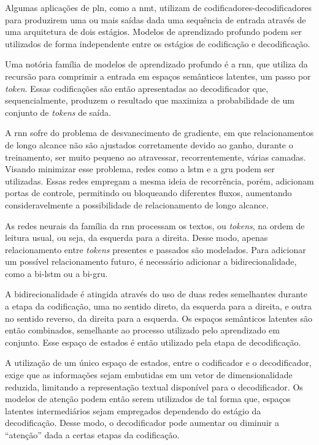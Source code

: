 Algumas aplicações de \gls{pln}, como a \gls{nmt}, utilizam de codificadores-decodificadores para produzirem uma ou mais saídas dada uma sequência de entrada através de uma arquitetura de dois estágios. Modelos de aprendizado profundo podem ser utilizados de forma independente entre os estágios de codificação e decodificação.

Uma notória família de modelos de aprendizado profundo é a \gls{rnn}, que utiliza da recursão para comprimir a entrada em espaços semânticos latentes, um passo por \textit{token}. Essas codificações são então apresentadas ao decodificador que, sequencialmente, produzem o resultado que maximiza a probabilidade de um conjunto de \textit{tokens} de saída.

A \gls{rnn} sofre do problema de desvanecimento de gradiente, em que relacionamentos de longo alcance não são ajustados corretamente devido ao ganho, durante o treinamento, ser muito pequeno ao atravessar, recorrentemente, várias camadas. Visando minimizar esse problema, redes como a \gls{lstm} e a \gls{gru} podem ser utilizadas. Essas redes empregam a mesma ideia de recorrência, porém, adicionam portas de controle, permitindo ou bloqueando diferentes fluxos, aumentando consideravelmente a possibilidade de relacionamento de longo alcance.

As redes neurais da família da \gls{rnn} processam os textos, ou \textit{tokens}, na ordem de leitura usual, ou seja, da esquerda para a direita. Desse modo, apenas relacionamento entre \textit{tokens} presentes e passados são modelados. Para adicionar um possível relacionamento futuro, é necessário adicionar a bidirecionalidade, como a \gls{bi-lstm} ou a \gls{bi-gru}.

A bidirecionalidade é atingida através do uso de duas redes semelhantes durante a etapa da codificação, uma no sentido direto, da esquerda para a direita, e outra no sentido reverso, da direita para a esquerda. Os espaços semânticos latentes são então combinados, semelhante ao processo utilizado pelo aprendizado em conjunto. Esse espaço de estados é então utilizado pela etapa de decodificação.

A utilização de um único espaço de estados, entre o codificador e o decodificador, exige que as informações sejam embutidas em um vetor de dimensionalidade reduzida, limitando a representação textual disponível para o decodificador. Os modelos de atenção podem então serem utilizados de tal forma que, espaços latentes intermediários sejam empregados dependendo do estágio da decodificação. Desse modo, o decodificador pode aumentar ou diminuir a \enquote{atenção} dada a certas etapas da codificação.

